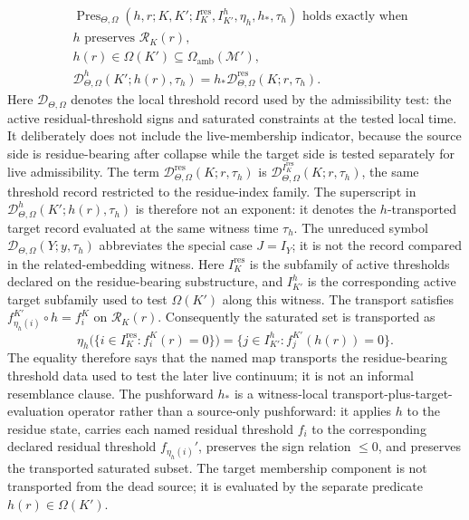\[
\begin{aligned}
&\operatorname{Pres}_{\Theta,\Omega}
  (h,r;K,K';I_K^{\mathrm{res}},I_{K'}^{h},\eta_h,h_\ast,\tau_h)
  \text{ holds exactly when}\\
&h \text{ preserves } \mathcal{R}_K(r),\\
&h(r)\in\Omega(K')\subseteq\Omega_{\mathrm{amb}}(\mathcal{M}'),\\
&\mathcal{D}^{h}_{\Theta,\Omega}(K';h(r),\tau_h)
  =h_{\ast}\mathcal{D}^{\mathrm{res}}_{\Theta,\Omega}(K;r,\tau_h).
\end{aligned}
\]
Here \(\mathcal{D}_{\Theta,\Omega}\) denotes the local threshold record used by
the admissibility test: the active residual-threshold signs and saturated
constraints at the tested local time. It deliberately does not include the
live-membership indicator, because the source side is residue-bearing after
collapse while the target side is tested separately for live admissibility. The term
\(\mathcal{D}^{\mathrm{res}}_{\Theta,\Omega}(K;r,\tau_h)\) is
\(\mathcal{D}^{I_K^{\mathrm{res}}}_{\Theta,\Omega}(K;r,\tau_h)\), the same
threshold record restricted to the residue-index family. The superscript in
\(\mathcal{D}^{h}_{\Theta,\Omega}(K';h(r),\tau_h)\) is therefore not an
exponent: it denotes the \(h\)-transported target record evaluated at the same
witness time \(\tau_h\). The unreduced symbol
\(\mathcal{D}_{\Theta,\Omega}(Y;y,\tau_h)\) abbreviates the special case
\(J=I_Y\); it is not the record compared in the related-embedding witness.
Here \(I_K^{\mathrm{res}}\) is the subfamily of active thresholds declared on
the residue-bearing substructure, and \(I_{K'}^{h}\) is the corresponding
active target subfamily used to test \(\Omega(K')\) along this witness. The
transport satisfies
\(f_{\eta_h(i)}^{K'}\circ h=f_i^K\) on \(\mathcal{R}_K(r)\).
Consequently the saturated set is transported as
\[
  \eta_h\bigl(\{i\in I_K^{\mathrm{res}}:f_i^K(r)=0\}\bigr)
  =
  \{j\in I_{K'}^{h}:f_j^{K'}(h(r))=0\}.
\]
The equality therefore says that the named map
transports the residue-bearing threshold data used to test
the later live continuum; it is not an informal resemblance clause. The
pushforward \(h_{\ast}\) is a witness-local transport-plus-target-evaluation
operator rather than a source-only pushforward: it applies \(h\) to the residue
state, carries each named residual threshold \(f_i\) to the corresponding
declared residual threshold \(f_{\eta_h(i)}'\), preserves the sign relation
\(\le 0\), and preserves the transported saturated subset. The target
membership component is not transported from the dead source; it is evaluated
by the separate predicate \(h(r)\in\Omega(K')\).

